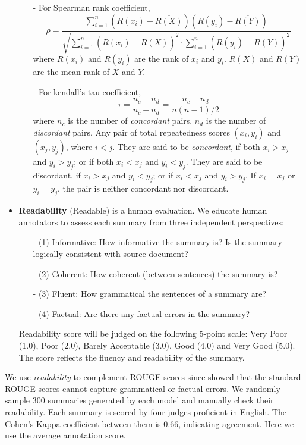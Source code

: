 \documentclass{nle}
\theoremstyle{definition}
\begin{document}
\begin{itemize}
\begin{itemize}
		\item[-] For Spearman rank coefficient,
		\begin{equation}
			\rho = \frac{\sum_{i=1}^{n}(R(x_i) - \overline{R(X)})(R(y_i) - \overline{R(Y)})}
			{\sqrt{\sum_{i=1}^{n}(R(x_i) - \overline{R(X)})^{2}
					\cdot\sum_{i=1}^{n}(R(y_i)-\overline{R(Y)})^{2}}}
		\end{equation}
		where $R(x_i)$ and $R(y_i)$ are the rank of $x_i$ and $y_i$.
		$\overline{R(X)}$ and $\overline{R(Y)}$ are the mean rank of $X$ and $Y$.
		
		\item[-] For kendall's tau coefficient,
		\begin{equation}
			\tau = \frac{n_c - n_d}{n_c + n_d} = \frac{n_c - n_d}{n(n-1)/2}
		\end{equation}
		where $n_c$ is the number of \textit{concordant} pairs.
		$n_d$ is the number of \textit{discordant} pairs.
		Any pair of total repeatedness scores $(x_{i},y_{i})$ and $(x_{j},y_{j})$, where $i<j$.
		They are said to be \textit{concordant},
		if both $x_{i}>x_{j}$ and $y_{i}>y_{j}$; or if both $x_{i}<x_{j}$ and $y_{i}<y_{j}$.
		They are said to be discordant, if $x_{i}>x_{j}$ and $y_{i}<y_{j}$; 
		or if $x_{i}<x_{j}$ and $y_{i}>y_{j}$. 
		If $x_{i}=x_{j}$ or $y_{i}=y_{j}$, the pair is neither concordant nor discordant.
	\end{itemize}
	
	
	\item \textbf{Readability} (Readable) is a human evaluation. 
	We educate human annotators to assess each summary
	from three independent perspectives: 
	\begin{itemize}
		\item[-]
		(1) Informative: How informative the summary is? 
		Is the summary logically consistent with source document? 
		\item[-]
		(2) Coherent: How coherent (between sentences) the summary is? 
		\item[-]
		(3) Fluent: How grammatical the sentences of a summary are? 
		\item[-]
		(4) Factual: Are there any factual errors in the summary?
	\end{itemize}
	Readability score will be judged on the following 5-point scale:
	Very Poor (1.0), Poor (2.0), Barely Acceptable (3.0), Good (4.0) and Very Good (5.0).
	The score reflects the fluency and readability of the summary.
\end{itemize}

We use \textit{readability} to complement ROUGE scores 
since \cite{YaoWX17} showed that the standard 
ROUGE scores cannot capture grammatical or factual errors. 
We randomly sample 300 summaries generated by each model
and manually check their readability. 
Each summary is scored by four judges proficient in English. 
The Cohen's Kappa coefficient between them is $0.66$, 
indicating agreement. Here we use the average annotation score.
\end{document}
